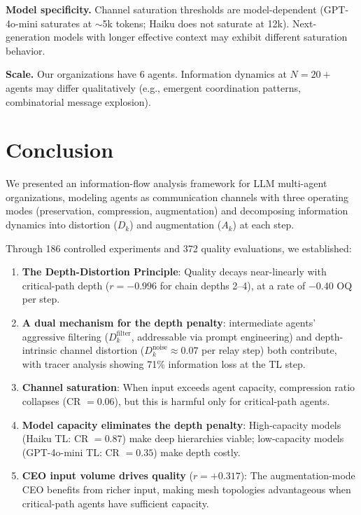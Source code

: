 \documentclass[conference]{IEEEtran}
\begin{document}
\textbf{Model specificity.}
Channel saturation thresholds are model-dependent (GPT-4o-mini saturates at $\sim$5k tokens; Haiku does not saturate at 12k).
Next-generation models with longer effective context may exhibit different saturation behavior.

\textbf{Scale.}
Our organizations have 6 agents.
Information dynamics at $N = 20+$ agents may differ qualitatively (e.g., emergent coordination patterns, combinatorial message explosion).


\section{Conclusion}
\label{sec:conclusion}

We presented an information-flow analysis framework for LLM multi-agent organizations, modeling agents as communication channels with three operating modes (preservation, compression, augmentation) and decomposing information dynamics into distortion ($D_k$) and augmentation ($A_k$) at each step.

Through 186 controlled experiments and 372 quality evaluations, we established:

\begin{enumerate}
    \item \textbf{The Depth-Distortion Principle}: Quality decays near-linearly with critical-path depth ($r = -0.996$ for chain depths 2--4), at a rate of $-0.40$ OQ per step.
    \item \textbf{A dual mechanism for the depth penalty}: intermediate agents' aggressive filtering ($D_k^{\text{filter}}$, addressable via prompt engineering) and depth-intrinsic channel distortion ($D_k^{\text{noise}} \approx 0.07$ per relay step) both contribute, with tracer analysis showing 71\% information loss at the TL step.
    \item \textbf{Channel saturation}: When input exceeds agent capacity, compression ratio collapses (CR $= 0.06$), but this is harmful only for critical-path agents.
    \item \textbf{Model capacity eliminates the depth penalty}: High-capacity models (Haiku TL: CR $= 0.87$) make deep hierarchies viable; low-capacity models (GPT-4o-mini TL: CR $= 0.35$) make depth costly.
    \item \textbf{CEO input volume drives quality} ($r = +0.317$): The augmentation-mode CEO benefits from richer input, making mesh topologies advantageous when critical-path agents have sufficient capacity.
\end{enumerate}
\end{document}
